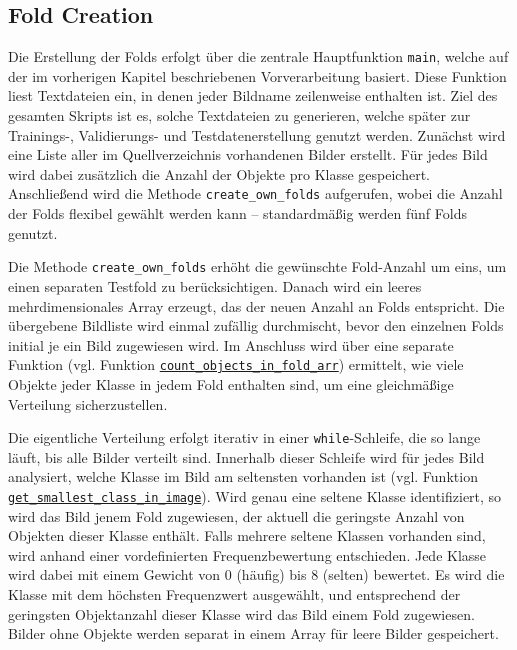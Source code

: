 \subsection{Fold Creation}
\label{subsec:Fold_creation}


Die Erstellung der Folds erfolgt über die zentrale Hauptfunktion \lstinline|main|, welche auf der im vorherigen Kapitel beschriebenen Vorverarbeitung basiert. Diese Funktion liest Textdateien ein, in denen jeder Bildname zeilenweise enthalten ist. Ziel des gesamten Skripts ist es, solche Textdateien zu generieren, welche später zur Trainings-, Validierungs- und Testdatenerstellung genutzt werden. Zunächst wird eine Liste aller im Quellverzeichnis vorhandenen Bilder erstellt. Für jedes Bild wird dabei zusätzlich die Anzahl der Objekte pro Klasse gespeichert. Anschließend wird die Methode \lstinline|create_own_folds| aufgerufen, wobei die Anzahl der Folds flexibel gewählt werden kann – standardmäßig werden fünf Folds genutzt.

Die Methode \lstinline|create_own_folds| erhöht die gewünschte Fold-Anzahl um eins, um einen separaten Testfold zu berücksichtigen. Danach wird ein leeres mehrdimensionales Array erzeugt, das der neuen Anzahl an Folds entspricht. Die übergebene Bildliste wird einmal zufällig durchmischt, bevor den einzelnen Folds initial je ein Bild zugewiesen wird. Im Anschluss wird über eine separate Funktion (vgl. Funktion \hyperlink{par:count_objects_in_fold_arr}{\lstinline|count_objects_in_fold_arr|}) ermittelt, wie viele Objekte jeder Klasse in jedem Fold enthalten sind, um eine gleichmäßige Verteilung sicherzustellen.

Die eigentliche Verteilung erfolgt iterativ in einer \texttt{while}-Schleife, die so lange läuft, bis alle Bilder verteilt sind. Innerhalb dieser Schleife wird für jedes Bild analysiert, welche Klasse im Bild am seltensten vorhanden ist (vgl. Funktion \hyperlink{par:get_smallest_class_in_image}{\lstinline|get_smallest_class_in_image|}). Wird genau eine seltene Klasse identifiziert, so wird das Bild jenem Fold zugewiesen, der aktuell die geringste Anzahl von Objekten dieser Klasse enthält. Falls mehrere seltene Klassen vorhanden sind, wird anhand einer vordefinierten Frequenzbewertung entschieden. Jede Klasse wird dabei mit einem Gewicht von 0 (häufig) bis 8 (selten) bewertet. Es wird die Klasse mit dem höchsten Frequenzwert ausgewählt, und entsprechend der geringsten Objektanzahl dieser Klasse wird das Bild einem Fold zugewiesen. Bilder ohne Objekte werden separat in einem Array für leere Bilder gespeichert.

